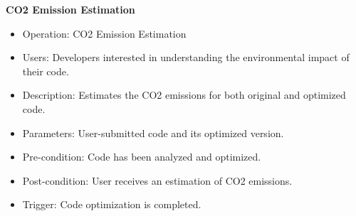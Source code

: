 \documentclass[conference,compsoc]{IEEEtran}
\begin{document}
\textbf{CO2 Emission Estimation}
\begin{itemize}
    \item Operation: CO2 Emission Estimation
    \item Users: Developers interested in understanding the environmental impact of their code.
    \item Description: Estimates the CO2 emissions for both original and optimized code.
    \item Parameters: User-submitted code and its optimized version.
    \item Pre-condition: Code has been analyzed and optimized.
    \item Post-condition: User receives an estimation of CO2 emissions.
    \item Trigger: Code optimization is completed.
\end{itemize}
\end{document}

